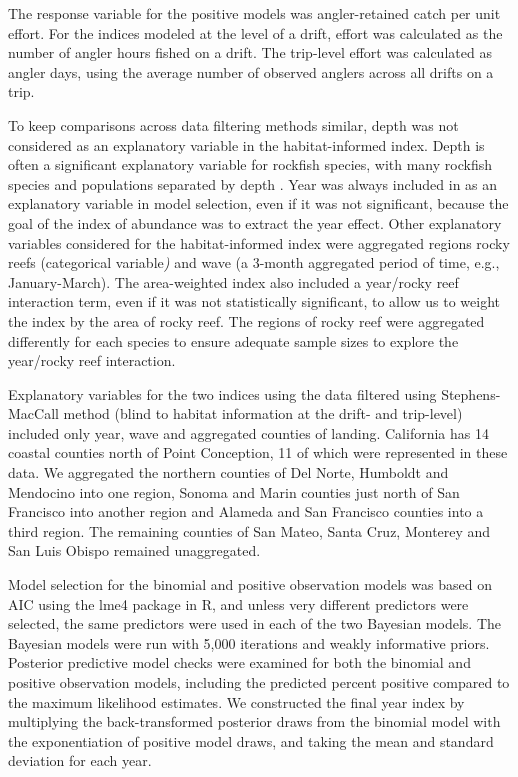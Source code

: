 \documentclass[
  12pt,
  authoryear,
  preprint,
  3p]{elsarticle}
\begin{document}
The response variable for the positive models was angler-retained catch
per unit effort. For the indices modeled at the level of a drift, effort
was calculated as the number of angler hours fished on a drift. The
trip-level effort was calculated as angler days, using the average
number of observed anglers across all drifts on a trip.

To keep comparisons across data filtering methods similar, depth was not
considered as an explanatory variable in the habitat-informed index.
Depth is often a significant explanatory variable for rockfish species,
with many rockfish species and populations separated by depth
\citep{Love:2002:RNP}. Year was always included in as an explanatory
variable in model selection, even if it was not significant, because the
goal of the index of abundance was to extract the year effect. Other
explanatory variables considered for the habitat-informed index were
aggregated regions rocky reefs (categorical variable\emph{)} and wave (a
3-month aggregated period of time, e.g., January-March). The
area-weighted index also included a year/rocky reef interaction term,
even if it was not statistically significant, to allow us to weight the
index by the area of rocky reef. The regions of rocky reef were
aggregated differently for each species to ensure adequate sample sizes
to explore the year/rocky reef interaction.

Explanatory variables for the two indices using the data filtered using
Stephens-MacCall method (blind to habitat information at the drift- and
trip-level) included only year, wave and aggregated counties of landing.
California has 14 coastal counties north of Point Conception, 11 of
which were represented in these data. We aggregated the northern
counties of Del Norte, Humboldt and Mendocino into one region, Sonoma
and Marin counties just north of San Francisco into another region and
Alameda and San Francisco counties into a third region. The remaining
counties of San Mateo, Santa Cruz, Monterey and San Luis Obispo remained
unaggregated.

Model selection for the binomial and positive observation models was
based on AIC using the lme4 package in R, and unless very different
predictors were selected, the same predictors were used in each of the
two Bayesian models. The Bayesian models were run with 5,000 iterations
and weakly informative priors. Posterior predictive model checks were
examined for both the binomial and positive observation models,
including the predicted percent positive compared to the maximum
likelihood estimates. We constructed the final year index by multiplying
the back-transformed posterior draws from the binomial model with the
exponentiation of positive model draws, and taking the mean and standard
deviation for each year.
\end{document}
